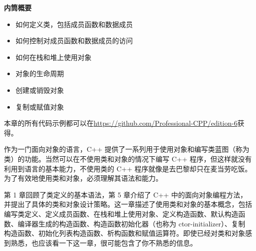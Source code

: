 \noindent
\textbf{内筒概要}

\begin{itemize}
\item
如何定义类，包括成员函数和数据成员

\item
如何控制对成员函数和数据成员的访问

\item
如何在栈和堆上使用对象

\item
对象的生命周期

\item
创建或销毁对象

\item
复制或赋值对象
\end{itemize}

本章的所有代码示例都可以在\url{https://github.com/Professional-CPP/edition-6}获得。

作为一门面向对象的语言，C++ 提供了一系列用于使用对象和编写类蓝图（称为类）的功能。当然可以在不使用类和对象的情况下编写 C++ 程序，但这样就没有利用到语言的基本能力，不使用类的 C++ 程序就像是去巴黎却只在麦当劳吃饭。为了有效地使用类和对象，必须理解其语法和能力。

第 1 章回顾了类定义的基本语法，第 5 章介绍了 C++ 中的面向对象编程方法，并提出了具体的类和对象设计策略。这一章描述了使用类和对象的基本概念，包括编写类定义、定义成员函数、在栈和堆上使用对象、定义构造函数、默认构造函数、编译器生成的构造函数、构造函数初始化器（也称为 ctor-initializer）、复制构造函数、初始化列表构造函数、析构函数和赋值运算符。即使已经对类和对象感到熟悉，也应该看一下这一章，很可能包含了你不熟悉的信息。
























